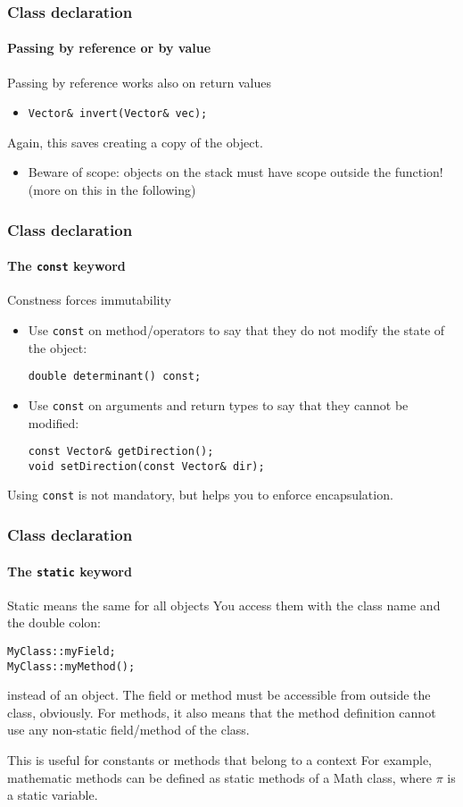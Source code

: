 \begin{frame}[fragile]
\frametitle{Class declaration}
\framesubtitle{Passing by reference or by value}

\begin{block}{Passing by reference works also on return values}
\begin{itemize}
\item \texttt{Vector\& invert(Vector\& vec); }
\end{itemize}
Again, this saves creating a copy of the object.
\begin{itemize}
\item Beware of scope: objects on the stack must have scope outside the function! (more on this in the following)
\end{itemize}
\end{block}

\end{frame}

\begin{frame}[fragile]
\frametitle{Class declaration}
\framesubtitle{The \texttt{const} keyword}

\begin{block}{Constness forces immutability}
\begin{itemize}
\item Use \texttt{const} on method/operators to say that they do not modify the state of the object:
\begin{verbatim}
double determinant() const;
\end{verbatim}
\item Use \texttt{const} on arguments and return types to say that they cannot be modified:
\begin{verbatim}
const Vector& getDirection();
void setDirection(const Vector& dir);
\end{verbatim}
\end{itemize}
Using \texttt{const} is not mandatory, but helps you to enforce encapsulation.
\end{block}

\end{frame}

\begin{frame}[fragile]
\frametitle{Class declaration}
\framesubtitle{The \texttt{static} keyword}

\begin{block}{Static means the same for all objects}
You access them with the class name and the double colon:
\begin{verbatim}
MyClass::myField;
MyClass::myMethod();
\end{verbatim}
instead of an object. The field or method must be accessible from outside the class, obviously.
For methods, it also means that the method definition cannot use any non-static field/method of the class. 
\end{block}
\pause
\begin{block}{This is useful for constants or methods that belong to a context}
For example, mathematic methods can be defined as static methods of a Math class, where $\pi$ is a static variable.
\end{block}

\end{frame}

